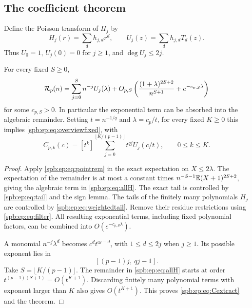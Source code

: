\subsection{The coefficient theorem}
Define the Poisson transform of $H_j$ by
\begin{equation}\label{spb:ep:eq:U}
 H_j(r)=\sum_d h_{j,d}r^d,
 \qquad U_j(z)=\sum_d h_{j,d}T_d(z).
\end{equation}
Thus $U_0=1$, $U_j(0)=0$ for $j\ge1$, and $\deg U_j\le2j$.

\begin{theorem}\label{spb:ep:thm:allp}
For every fixed $S\ge0$,
\begin{equation}\label{spb:ep:eq:allH}
 \mathcal R_p(n)=\sum_{j=0}^S n^{-j}U_j(\lambda)
   +O_{p,S}\left(\frac{(1+\lambda)^{2S+2}}{n^{S+1}}
                              +e^{-c_{p,S}\lambda}\right)
\end{equation}
for some $c_{p,S}>0$. In particular the exponential term can be absorbed
into the algebraic remainder. Setting $t=n^{-1/q}$ and $\lambda=c_p/t$,
for every fixed $K\ge0$ this implies \eqref{spb:ep:eq:overviewfixed}, with
\begin{equation}\label{spb:ep:eq:Cextract}
 C_{p,k}(c)=[t^k]\sum_{j=0}^{\lfloor K/(p-1)\rfloor}
                         t^{qj}U_j(c/t),\qquad 0\le k\le K.
\end{equation}
\end{theorem}
\begin{proof}
Apply \eqref{spb:ep:eq:pointrem} in the exact expectation on $X\le2\lambda$.
The expectation of the remainder is at most a constant times
$n^{-S-1}\mathbb E(X+1)^{2S+2}$, giving the algebraic term in \eqref{spb:ep:eq:allH}.
The exact tail is controlled by \eqref{spb:ep:eq:tail} and the sign lemma.
The tails of the finitely many polynomials $H_j$ are controlled by
\eqref{spb:ep:eq:weightedtail}. Remove their residue restrictions using
\eqref{spb:ep:eq:filter}. All resulting exponential terms, including fixed
polynomial factors, can be combined into $O(e^{-c_{p,S}\lambda})$.

A monomial $n^{-j}\lambda^d$ becomes $c^dt^{qj-d}$, with
$1\le d\le2j$ when $j\ge1$. Its possible exponent lies in
\begin{equation}\label{spb:ep:eq:bands}
 [(p-1)j,\ qj-1].
\end{equation}
Take $S=\lfloor K/(p-1)\rfloor$.
The remainder in \eqref{spb:ep:eq:allH} starts at order
$t^{(p-1)(S+1)}=O(t^{K+1})$.
Discarding finitely many polynomial terms with exponent larger than $K$
also gives $O(t^{K+1})$. This proves \eqref{spb:ep:eq:Cextract} and the theorem.
\end{proof}

